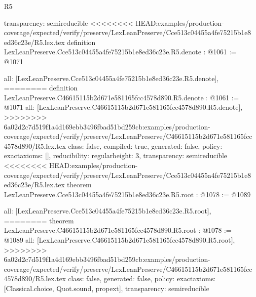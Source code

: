 \begin{lexlean}{R5}
\begin{coremodule}
{{{{{{{{  transparency: semireducible
}
<<<<<<<< HEAD:examples/production-coverage/expected/verify/preserve/LexLeanPreserve/Cce513c04455a4fe75215b1e8ed36c23e/R5.lex.tex
definition LexLeanPreserve.Cce513c04455a4fe75215b1e8ed36c23e.R5.denote : @1061 := @1071 {
  all: [LexLeanPreserve.Cce513c04455a4fe75215b1e8ed36c23e.R5.denote],
========
definition LexLeanPreserve.C46615115b2d671e581165fcc4578d890.R5.denote : @1061 := @1071 {
  all: [LexLeanPreserve.C46615115b2d671e581165fcc4578d890.R5.denote],
>>>>>>>> 6a02d2c7d519f1a4d169ebb3496fbad51bd259cb:examples/production-coverage/expected/verify/preserve/LexLeanPreserve/C46615115b2d671e581165fcc4578d890/R5.lex.tex
  class: false,
  compiled: true,
  generated: false,
  policy: exact{axioms: []},
  reducibility: regular{height: 3},
  transparency: semireducible
}
<<<<<<<< HEAD:examples/production-coverage/expected/verify/preserve/LexLeanPreserve/Cce513c04455a4fe75215b1e8ed36c23e/R5.lex.tex
theorem LexLeanPreserve.Cce513c04455a4fe75215b1e8ed36c23e.R5.root : @1078 := @1089 {
  all: [LexLeanPreserve.Cce513c04455a4fe75215b1e8ed36c23e.R5.root],
========
theorem LexLeanPreserve.C46615115b2d671e581165fcc4578d890.R5.root : @1078 := @1089 {
  all: [LexLeanPreserve.C46615115b2d671e581165fcc4578d890.R5.root],
>>>>>>>> 6a02d2c7d519f1a4d169ebb3496fbad51bd259cb:examples/production-coverage/expected/verify/preserve/LexLeanPreserve/C46615115b2d671e581165fcc4578d890/R5.lex.tex
  class: false,
  generated: false,
  policy: exact{axioms: [Classical.choice, Quot.sound, propext]},
  transparency: semireducible
}

}}}}}}}}}
\end{coremodule}
\end{lexlean}
